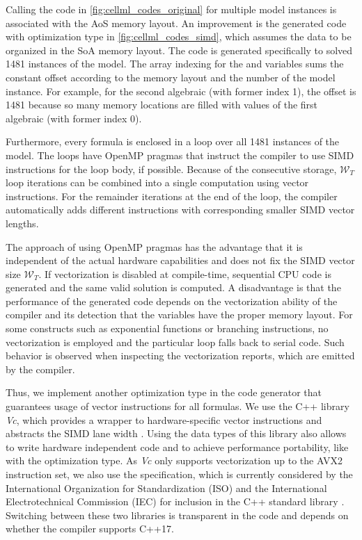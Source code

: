Calling the code in \cref{fig:cellml_codes_original} for multiple model instances is associated with the AoS memory layout.
An improvement is the generated code with optimization type  in \cref{fig:cellml_codes_simd}, which assumes the data to be organized in the SoA memory layout. The code is generated specifically to solved 1481 instances of the model. The array indexing for the  and  variables sums the constant offset according to the memory layout and the number of the model instance. For example, for the second algebraic (with former index 1), the offset is 1481 because so many memory locations are filled with values of the first algebraic (with former index 0).

Furthermore, every formula is enclosed in a loop over all 1481 instances of the model. The loops have OpenMP pragmas that instruct the compiler to use SIMD instructions for the loop body, if possible. Because of the consecutive storage, $\mathcal{W}_T$ loop iterations can be combined into a single computation using vector instructions. For the remainder iterations at the end of the loop, the compiler automatically adds different instructions with corresponding smaller SIMD vector lengths.

The approach of using OpenMP pragmas has the advantage that it is independent of the actual hardware capabilities and does not fix the SIMD vector size $\mathcal{W}_T$. If vectorization is disabled at compile-time, sequential CPU code is generated and the same valid solution is computed. A disadvantage is that the performance of the generated code depends on the vectorization ability of the compiler and its detection that the variables have the proper memory layout. For some constructs such as exponential functions or branching instructions, no vectorization is employed and the particular loop falls back to serial code. Such behavior is observed when inspecting the vectorization reports, which are emitted by the compiler.

Thus, we implement another optimization type  in the code generator that guarantees usage of vector instructions for all formulas. We use the C++ library \emph{Vc}, which provides a wrapper to hardware-specific vector instructions and abstracts the SIMD lane width \cite{vc2012,Kretz2015}. Using the data types of this library also allows to write hardware independent code and to achieve performance portability, like with the  optimization type. 
As \emph{Vc} only supports vectorization up to the AVX2 instruction set, we also use the  specification, which is currently considered by the International Organization for Standardization (ISO) and the International Electrotechnical Commission (IEC) for inclusion in the C++ standard library \cite{hoberock2016working}. Switching between these two libraries is transparent in the code and depends on whether the compiler supports C++17.

